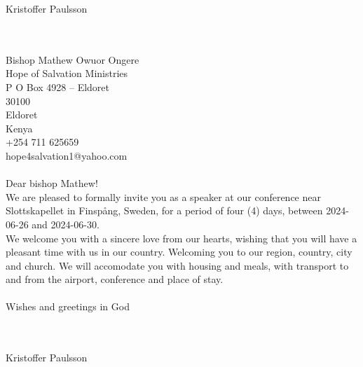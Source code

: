 \documentclass[11pt,a4paper,notitlepage]{article}
\date{\displaydate{date}}
\begin{document}
    \begin{center}\huge{Kristoffer Paulsson}\end{center}
    \begin{center}\end{center}
    \bigskip
    \bigskip
    \bigskip
    \bigskip
    \bigskip \\ \\ %
    Bishop Mathew Owuor Ongere
    \bigskip \\ %
    Hope of Salvation Ministries \\
    P O Box 4928 -- Eldoret \\
    30100 \\
    Eldoret \\
    Kenya
    \bigskip \\ %
    +254 711 625659 \\
    hope4salvation1@yahoo.com
    \bigskip \\ \\ %
    Dear bishop Mathew!
    \bigskip \\ %
    We are pleased to formally invite you as a speaker at our conference near Slottskapellet in Finspång, Sweden,
    for a period of four (4) days, between 2024-06-26 and 2024-06-30. \\
    We welcome you with a sincere love from our hearts, wishing that you will have a pleasant time with us in our country.
    Welcoming you to our region, country, city and church. We will accomodate you with housing and meals, with
    transport to and from the airport, conference and place of stay.
    \bigskip \\ \\
    Wishes and greetings in God
    \bigskip \\ \\
    \begin{minipage}{ 6cm }
        \bigskip
        \hrulefill \\
        Kristoffer Paulsson
    \end{minipage}
\end{document}

